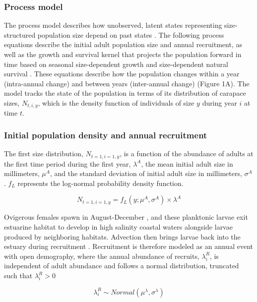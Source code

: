 \documentclass{article}
\begin{document}
\subsubsection{Process model}

The process model describes how unobserved, latent states representing size-structured population size depend on past states \parencite{auger2021guide}. The following process equations describe the initial adult population size and annual recruitment, as well as the growth and survival kernel that projects the population forward in time based on seasonal size-dependent growth and size-dependent natural survival \parencite{rees2014building}. These equations describe how the population changes within a year (intra-annual change) and between years (inter-annual change) (Figure 1A). The model tracks the state of the population in terms of its distribution of carapace sizes, $N_{t, i, y}$, which is the density function of individuals of size $y$ during year $i$ at time $t$. 

\subsubsection*{Initial population density and annual recruitment}

The first size distribution, $N_{t=1, i=1, y}$, is a function of the abundance of adults at the first time period during the first year, $\lambda^{A}$, the mean initial adult size in millimeters, $\mu^A$, and the standard deviation of initial adult size in millimeters, $\sigma^A$. $f_L$ represents the log-normal probability density function.

\begin{equation}
N_{t=1, i=1, y} = f_L(y; \mu^A, \sigma^A) \times \lambda^A
\end{equation}

Ovigerous females spawn in August-December \parencite{klassen2007biological}, and these planktonic larvae exit estuarine habitat to develop in high salinity coastal waters alongside larvae produced by neighboring habitats. Advection then brings larvae back into the estuary during recruitment \parencite{young2019life}. Recruitment is therefore modeled as an annual event with open demography, where the annual abundance of recruits, $\lambda^R_i$, is independent of adult abundance and follows a normal distribution, truncated such that $\lambda^R_i > 0$  

\begin{equation}
\lambda^R_i \sim Normal(\mu^{\lambda}, \sigma^{\lambda})
\end{equation}
\end{document}
